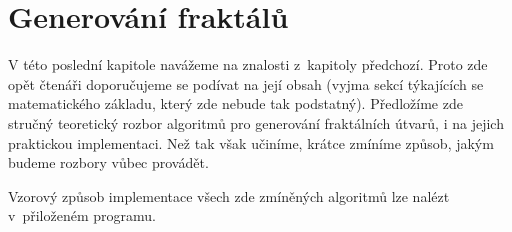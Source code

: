 \chapter{Generování fraktálů}\label{chapter:generovani-fraktalu}

V této poslední kapitole navážeme na znalosti z~kapitoly předchozí. Proto zde opět čtenáři doporučujeme se podívat na její obsah (vyjma sekcí týkajících se matematického základu, který zde nebude tak podstatný). Předložíme zde stručný teoretický rozbor algoritmů pro generování fraktálních útvarů, i na jejich praktickou implementaci. Než tak však učiníme, krátce zmíníme způsob, jakým budeme rozbory vůbec provádět.

Vzorový způsob implementace všech zde zmíněných algoritmů lze nalézt v~přiloženém programu.




